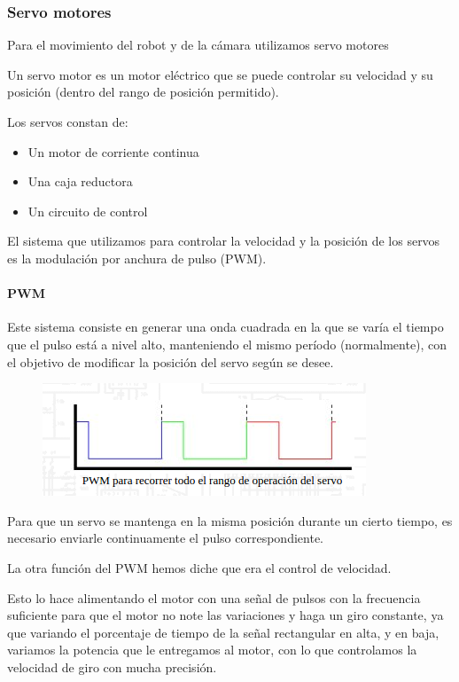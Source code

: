 \documentclass[twoside, 12pt]{epstfg}
\begin{document}
\subsubsection{Servo motores}
Para el movimiento del robot y de la cámara utilizamos servo motores


Un servo motor es un motor eléctrico que se puede controlar su velocidad y su posición (dentro del rango de posición permitido).

Los servos constan de:
\begin{itemize}
	\item Un motor de corriente continua
	\item Una caja reductora
	\item Un circuito de control
\end{itemize}

El sistema que utilizamos para controlar la velocidad y la posición de los servos es la modulación por anchura de pulso (PWM).

\paragraph{PWM}

Este sistema consiste en generar una onda cuadrada en la que se varía el tiempo que el pulso está a nivel alto, manteniendo el mismo período (normalmente), con el objetivo de modificar la posición del servo según se desee.

\begin{figure}[h]
	\centerline{
		\mbox{\includegraphics[width=.80\textwidth]{images/ondaServo.png}}
	}
	
\end{figure}



Para que un servo se mantenga en la misma posición durante un cierto tiempo, es necesario enviarle continuamente el pulso correspondiente.


La otra función del PWM hemos diche que era el control de velocidad.

Esto lo hace alimentando el motor con una señal de pulsos con la frecuencia suficiente para que el motor no note las variaciones y haga un giro constante, ya que variando el porcentaje de tiempo de la señal rectangular en alta, y en baja, variamos la potencia que le entregamos al motor, con lo que controlamos la velocidad de giro con mucha precisión.
\end{document}
